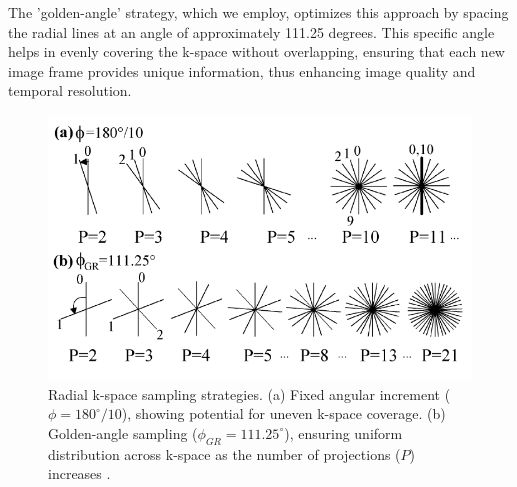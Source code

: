 \documentclass{micro-econ-thesis}
\begin{document}
 The 'golden-angle' strategy, which we employ, optimizes this approach by spacing the radial lines at an angle of approximately 111.25 degrees. This specific angle helps in evenly covering the k-space without overlapping, ensuring that each new image frame provides unique information, thus enhancing image quality and temporal resolution. 
 
\begin{figure}[H]
	\centering
	\includegraphics[width=0.7\linewidth]{golden_angle_figure}
	\caption{Radial k-space sampling strategies. (a) Fixed angular increment ($\phi = 180^\circ / 10$), showing potential for uneven k-space coverage. (b) Golden-angle sampling ($\phi_{GR} = 111.25^\circ$), ensuring uniform distribution across k-space as the number of projections ($P$) increases \parencite{winkelmann_optimal_2007}.}
	\label{fig:goldenanglefigure}
\end{figure}
\end{document}
